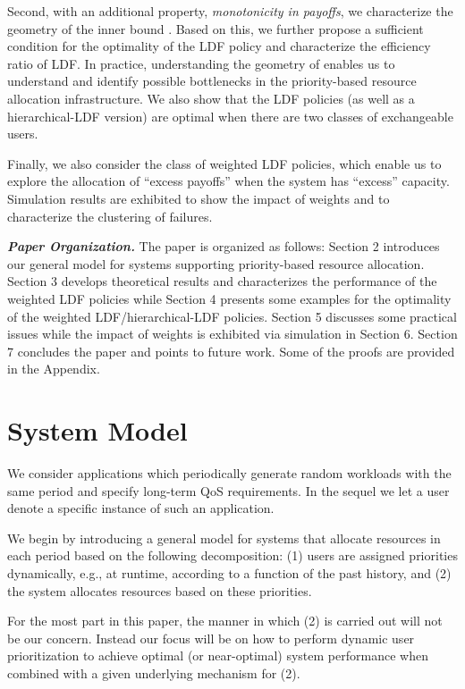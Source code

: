 \documentclass[prodmode,acmtompecs]{acmsmall}
\newcommand{\myComments}[1]{}
\newif\ifextended
\newcommand{\extendedStart}{\ifextended  \myComments{Extended version: }}
\newcommand{\commentEnd}{\myComments{End}}
\begin{document}
Second, with an additional property, {\em monotonicity in payoffs}, we characterize the geometry of the inner bound . 
Based on this, we further propose a sufficient condition for the optimality of the LDF policy and characterize the efficiency ratio of LDF. 
In practice, understanding the geometry of  enables us to understand and identify possible bottlenecks in the priority-based resource allocation infrastructure. 
We also show that the LDF policies (as well as a hierarchical-LDF version) are optimal when there are two classes of exchangeable users. 

Finally, we also consider the class of weighted LDF policies, which enable us to explore the allocation of ``excess payoffs'' when the system has ``excess'' capacity. Simulation results are exhibited to show the impact of weights and to characterize the clustering of failures. 

{\bf \em Paper Organization. }
The paper is organized as follows: Section 2 introduces our general model for systems supporting priority-based resource allocation. Section 3 develops theoretical results and characterizes the performance of the weighted LDF policies while Section 4 presents some examples for the optimality of the weighted LDF/hierarchical-LDF policies. Section 5 discusses some practical issues while the impact of weights is exhibited via simulation in Section 6. Section 7 concludes the paper and points to future work. Some of the proofs are provided in the Appendix.

\section{System Model}
\label{sec_system_model}
We consider applications which periodically generate random workloads with the same period and specify long-term QoS requirements. In the sequel we let a user denote a specific instance of such an application. 

We begin by introducing a general model for systems that allocate resources in each period based on the following decomposition: 
(1) users are assigned priorities dynamically, e.g., at runtime, according to a function of the past history, and (2) the system allocates resources based on these priorities. 

For the most part in this paper, the manner in which (2) is carried out will not be our concern. Instead our focus will be on how to perform dynamic user prioritization to achieve optimal (or near-optimal) system performance when combined with a given underlying mechanism for (2). 
\extendedStart
In our follow-up work \cite{DuD16S}, we consider a specific system model and study the combined design of (1) and (2). 
\commentEnd\fi
\end{document}
